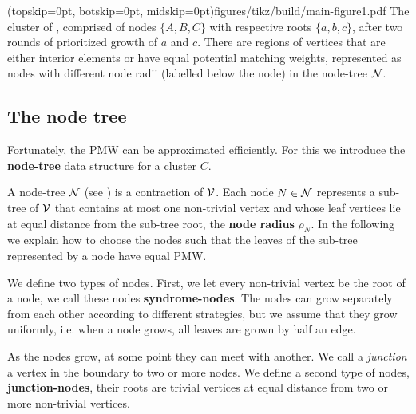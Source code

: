 \Figure[bt](topskip=0pt, botskip=0pt, midskip=0pt){figures/tikz/build/main-figure1.pdf}{
    The cluster of , comprised of nodes $\{A, B, C\}$ with respective roots $\{a, b, c\}$, after two rounds of prioritized growth of $a$ and $c$. There are regions of vertices that are either interior elements or have equal potential matching weights, represented as nodes with different node radii (labelled below the node) in the node-tree $\mathcal{N}$. \label{fig:pmw}}

\subsection{The node tree}\label{sec:nodeset}
Fortunately, the PMW can be approximated efficiently. 
For this we introduce the \textbf{node-tree} data structure for a cluster $C$. 

A node-tree $\mathcal{N}$ (see ) is a contraction of $\mathcal{V}$. Each node $N\in\mathcal{N}$ represents a sub-tree of $\mathcal{V}$ that contains at most one non-trivial vertex and whose leaf vertices lie at equal distance from the sub-tree root, the \textbf{node radius} $\rho_N$. In the following we explain how to choose the nodes such that the leaves of the sub-tree represented by a node have equal PMW.

We define two types of nodes. First, we let every non-trivial vertex be the root of a node, we call these nodes \textbf{syndrome-nodes}. The nodes can grow separately from each other according to different strategies, but we assume that they grow uniformly, i.e. when a node grows, all leaves are grown by half an edge.

As the nodes grow, at some point they can meet with another. We call a \emph{junction} a vertex in the boundary to two or more nodes. We define a second type of nodes, \textbf{junction-nodes}, their roots are trivial vertices at equal distance from two or more non-trivial vertices.


